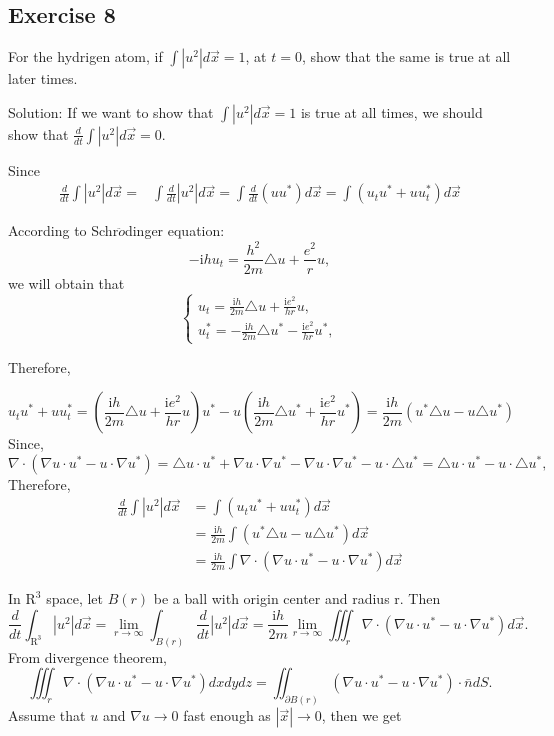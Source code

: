 \documentclass{article}
\begin{document}
		\subsection{Exercise 8}
	For the hydrigen atom, if $ \int \left | u^2 \right | d \vec{x } =1$, at $t=0$, show that the same is true at all later times.
		
		Solution: If we want to show that $ \int \left | u^2 \right | d \vec{x } =1$ is true at all times, we should show that $\frac{d}{dt}\int \left | u^2 \right | d \vec{x } =0$.
                  
		Since
		\begin{align*}
			 \frac{d}{dt}\int \left | u^2 \right | d \vec{x } =&
			 \int \frac{d}{dt} \left | u^2 \right | d \vec{x }=
			 \int \frac{d}{dt} \left(uu^* \right)d \vec{x }=
			 \int\left(  u_{t}u^*+uu_{t}^*\right) d \vec{x }
		\end{align*}

		According to Schr$\ddot{o}$dinger equation: 
		\[-\mathrm{i}hu_{t}=\frac{h^2}{2m}\triangle u+ \frac{e^2}{r}u,\]
		we will obtain that
		\begin{equation*}
			\begin{cases}
				u_{t}=\frac{\mathrm{i}h}{2m}\triangle u+ \frac{\mathrm{i}e^2}{hr}u,
				\\
				u_{t}^*=-\frac{\mathrm{i}h}{2m}\triangle u^*-\frac{\mathrm{i}e^2}{hr}u^*,
			\end{cases}
		\end{equation*}
		

		Therefore,

			\[u_{t}u^*+uu_{t}^*=(\frac{\mathrm{i}h}{2m}\triangle u+\frac{\mathrm{i}e^2}{hr}u)u^*-u(\frac{\mathrm{i}h}{2m}\triangle u^*+\frac{\mathrm{i}e^2}{hr}u^*)= \frac{\mathrm{i}h}{2m} (u^*\triangle u -u\triangle u^*) \]
			Since, \[\nabla \cdot (\nabla u \cdot u^* -u\cdot \nabla u^*)= \triangle u \cdot u^*+ \nabla u\cdot \nabla u^*- \nabla u\cdot \nabla u^*- u\cdot\triangle u^*=\triangle u \cdot u^*-u\cdot\triangle u^*,\]
			Therefore,
	\begin{align*}
		\frac{d}{dt}\int \left | u^2 \right | d \vec{x }&=\int(u_{t}u^*+uu_{t}^*)  d \vec{x } \\
		&= \frac{\mathrm{i}h}{2m}\int(u^*\triangle u -u\triangle u^*)d \vec{x } \\
		&=\frac{\mathrm{i}h}{2m}\int \nabla \cdot (\nabla u \cdot u^* -u\cdot \nabla u^*)d \vec{x }
	\end{align*}

            In $\mathrm{R}^3$ space, let $B(r)$ be a ball with origin center and radius r.
			Then \[ \frac{d}{dt}\int_{\mathrm{R^3} }^{}  \left | u^2 \right | d \vec{x }= \lim_{r \to \infty}\int_{B(r)}\frac{d}{dt} \left | u^2 \right | d \vec{x }= \frac{\mathrm{i}h}{2m}\lim_{r \to \infty}\iiint_{r}^{} \nabla \cdot (\nabla u \cdot u^* -u\cdot \nabla u^*)d \vec{x }.\]
			From divergence theorem,
			\[\iiint_{r}^{} \nabla \cdot (\nabla u \cdot u^* -u\cdot \nabla u^*)dx dy dz= \iint_{\partial B(r)}^{}(\nabla u \cdot u^* -u\cdot \nabla u^*) \cdot \bar{n} dS.	\]
			Assume that $u$ and $\nabla u \to 0$ fast enough as $\left | \vec{x} \right | \to 0$, then we get
		
\end{document}
